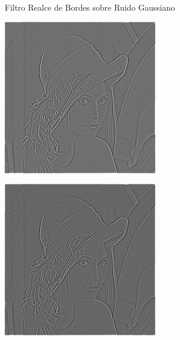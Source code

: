 \documentclass{beamer}
\begin{document}
\begin{frame}[fragile]{Filtro Realce de Bordes sobre Ruido Gaussiano}
	\begin{minipage}{0.25\linewidth}
		\centering
		\includegraphics[width=\linewidth]{../results/lena_gauss_sigma10_bordes}
	\end{minipage}\hfill
	\begin{minipage}{0.25\linewidth}
		\centering
		\includegraphics[width=\linewidth]{../results/lena_gauss_sigma20_bordes}

\end{minipage}
\end{frame}
\end{document}
